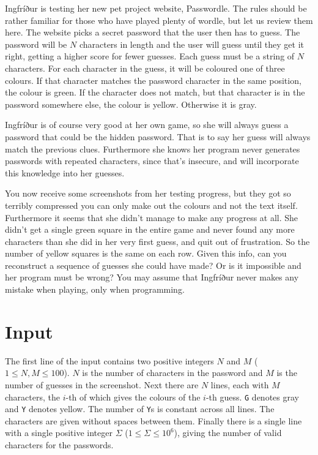 
Ingfríður is testing her new pet project website, Passwordle.
The rules should be rather familiar for those who have played
plenty of wordle, but let us review them here. The website picks
a secret password that the user then has to guess. The password
will be $N$ characters in length and the user will guess until
they get it right, getting a higher score for fewer guesses.
Each guess must be a string of $N$ characters. For each character
in the guess, it will be coloured one of three colours. If that
character matches the password character in the same position,
the colour is green. If the character does not match, but that
character is in the password somewhere else, the colour is
yellow. Otherwise it is gray.

Ingfríður is of course very good at her own game, so she will
always guess a password that could be the hidden password.
That is to say her guess will always match the previous clues.
Furthermore she knows her program never generates passwords with
repeated characters, since that's insecure, and will incorporate
this knowledge into her guesses.

You now receive some screenshots from her testing progress, but
they got so terribly compressed you can only make out the colours
and not the text itself. Furthermore it seems that she didn't 
manage to make any progress at all. She didn't get a single green
square in the entire game and never found any more characters than
she did in her very first guess, and quit
out of frustration. So the number of yellow squares is the same
on each row. Given this info, can you reconstruct a
sequence of guesses she could have made? Or is it impossible and
her program must be wrong? You may assume that Ingfríður never
makes any mistake when playing, only when programming.

\section*{Input}

The first line of the input contains two positive integers
$N$ and $M$ ($1 \leq N, M \leq 100$). $N$ is the number of characters in the
password and $M$ is the number of guesses in the screenshot.
Next there are $N$ lines, each with $M$ characters, the $i$-th
of which gives the colours of the $i$-th guess. \texttt{G} denotes
gray and \texttt{Y} denotes yellow. The number of \texttt{Y}s is
constant across all lines. The characters are
given without spaces between them. 
Finally there is a single line with a single
positive integer $\Sigma$ ($1 \leq \Sigma \leq 10^6$), giving the number
of valid characters for the passwords.


